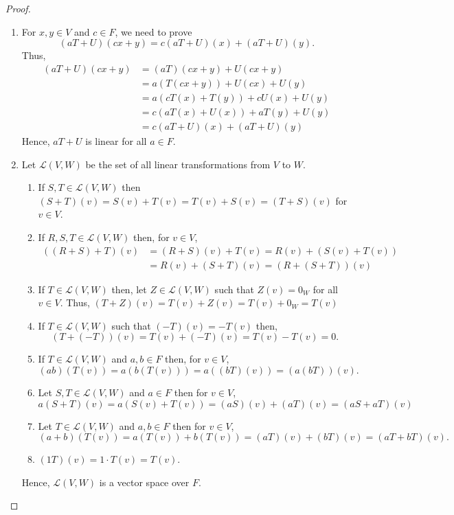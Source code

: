 \documentclass[12pt, a4paper]{article}
\theoremstyle{definition}
\theoremstyle{remark}
\newcommand{\LL}{\mathscr{L}}
\begin{document}
\begin{proof}
    \begin{enumerate}
        \item For $x,y \in V$ and $c \in F$, we need to prove \[(aT+U)(cx+y) = c(aT+U)(x) + (aT+U)(y).\] Thus,
        \begin{align*}
            (aT+U)(cx+y) &= (aT)(cx+y) + U(cx+y) \\
            &= a(T(cx+y)) + U(cx) + U(y) \\
            &= a(cT(x) + T(y)) + cU(x) +U(y) \\
            &= c(aT(x) + U(x)) + aT(y) + U(y) \\
            &= c(aT+U)(x) + (aT+U)(y)
        \end{align*}
        Hence, $aT+U$ is linear for all $a \in F$.

        \item Let $\LL(V,W)$ be the set of all linear transformations from $V$ to $W$.

        \begin{enumerate}
        \item If $S, T \in \LL(V,W)$ then $(S+T)(v) = S(v) + T(v) = T(v) + S(v) = (T+S)(v)$ for $v \in V$.
        
        \item If $R, S, T \in \LL(V,W)$ then, for $v \in V$,
        \begin{align*}
            ((R+S) + T)(v) &= (R+S)(v) + T(v) = R(v) + (S(v) + T(v)) \\ &= R(v) + (S+T)(v) = (R + (S+T))(v)
        \end{align*}
        
        \item If $T \in \LL(V,W)$ then, let $Z \in \LL(V,W)$ such that $Z(v) = 0_W$ for all $v \in V$. Thus, $(T+Z)(v) = T(v) + Z(v) = T(v) + 0_W = T(v)$
        
        \item If $T \in \LL(V,W)$ such that $(-T)(v) = -T(v)$ then,
        $$(T + (-T))(v) = T(v) + (-T)(v) = T(v) - T(v) = 0.$$
        
        \item If $T \in \LL(V,W)$ and $a,b \in F$ then, for $v \in V$,
        $$(ab)(T(v)) = a(b(T(v))) = a((bT)(v)) = (a(bT))(v).$$
        
        \item Let $S, T \in \LL(V,W)$ and $a \in F$ then for $v \in V$,
        $$a(S+T)(v) = a(S(v) + T(v)) = (aS)(v) + (aT)(v) = (aS + aT)(v)$$
        
        \item Let $T \in \LL(V,W)$ and $a,b \in F$ then for $v \in V$,
        $$(a+b)(T(v)) = a(T(v)) + b(T(v)) = (aT)(v) + (bT)(v) = (aT + bT)(v).$$
        
        \item $(1T)(v) = 1 \cdot T(v) = T(v)$.
        \end{enumerate}

        Hence, $\LL(V,W)$ is a vector space over $F$.
    \end{enumerate}
\end{proof}
\end{document}
